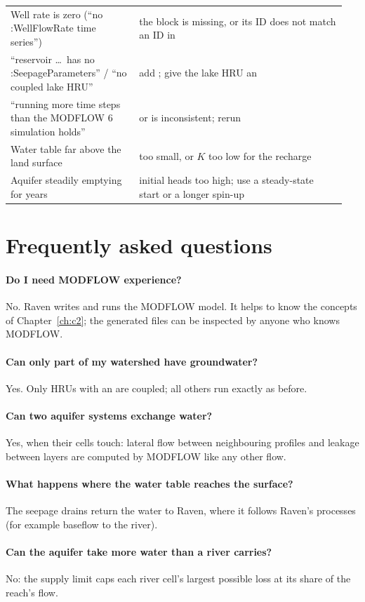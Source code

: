 \begin{table}[!htbp]
\begin{tabular}{P{0.36\linewidth}P{0.588\linewidth}}
Well rate is zero (``no :WellFlowRate time series'') & the  block is missing, or its ID does not match an ID in \\
``reservoir \dots\ has no :SeepageParameters'' / ``no coupled lake HRU'' & add ; give the lake HRU an \\
``running more time steps than the MODFLOW 6 simulation holds'' &  or  is inconsistent; rerun\\
Water table far above the land surface &  too small, or $K$ too low for the recharge\\
Aquifer steadily emptying for years & initial heads too high; use a steady-state start or a longer spin-up\\\bottomrule
\end{tabular}
\end{table}

\section{Frequently asked questions}
\paragraph{Do I need MODFLOW experience?} No. Raven writes and runs the MODFLOW model. It helps to know the concepts of
Chapter~\ref{ch:c2}; the generated files can be inspected by anyone who knows MODFLOW.
\paragraph{Can only part of my watershed have groundwater?} Yes. Only HRUs with an  are coupled; all
others run exactly as before.
\paragraph{Can two aquifer systems exchange water?} Yes, when their cells touch: lateral flow between neighbouring profiles and
leakage between layers are computed by MODFLOW like any other flow.
\paragraph{What happens where the water table reaches the surface?} The seepage drains return the water to Raven, where it
follows Raven's processes (for example baseflow to the river).
\paragraph{Can the aquifer take more water than a river carries?} No: the supply limit caps each river cell's largest
possible loss at its share of the reach's flow.

